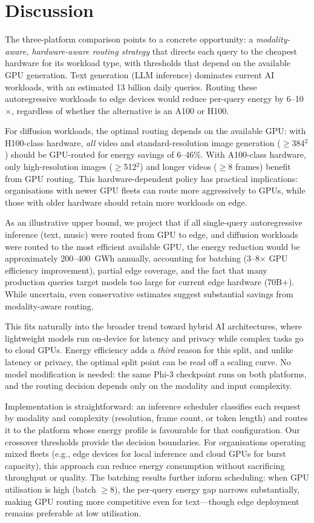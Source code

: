 \documentclass[11pt]{article}
\begin{document}
\section{Discussion}

The three-platform comparison points to a concrete opportunity: a \textit{modality-aware, hardware-aware routing strategy} that directs each query to the cheapest hardware for its workload type, with thresholds that depend on the available GPU generation. Text generation (LLM inference) dominates current AI workloads, with an estimated 13 billion daily queries\cite{devries2023growing}. Routing these autoregressive workloads to edge devices would reduce per-query energy by 6--10$\times$, regardless of whether the alternative is an A100 or H100.

For diffusion workloads, the optimal routing depends on the available GPU: with H100-class hardware, \textit{all} video and standard-resolution image generation ($\geq$384$^2$) should be GPU-routed for energy savings of 6--46\%. With A100-class hardware, only high-resolution images ($\geq$512$^2$) and longer videos ($\geq$8 frames) benefit from GPU routing. This hardware-dependent policy has practical implications: organisations with newer GPU fleets can route more aggressively to GPUs, while those with older hardware should retain more workloads on edge.

As an illustrative upper bound, we project that if all single-query autoregressive inference (text, music) were routed from GPU to edge, and diffusion workloads were routed to the most efficient available GPU, the energy reduction would be approximately 200--400~GWh annually, accounting for batching (3--8$\times$ GPU efficiency improvement\cite{wu2022sustainable}), partial edge coverage, and the fact that many production queries target models too large for current edge hardware (70B+). While uncertain, even conservative estimates suggest substantial savings from modality-aware routing.

This fits naturally into the broader trend toward hybrid AI architectures, where lightweight models run on-device for latency and privacy while complex tasks go to cloud GPUs\cite{xu2024edge}. Energy efficiency adds a \textit{third} reason for this split, and unlike latency or privacy, the optimal split point can be read off a scaling curve. No model modification is needed: the same Phi-3 checkpoint runs on both platforms, and the routing decision depends only on the modality and input complexity.

Implementation is straightforward: an inference scheduler classifies each request by modality and complexity (resolution, frame count, or token length) and routes it to the platform whose energy profile is favourable for that configuration. Our crossover thresholds provide the decision boundaries. For organisations operating mixed fleets (e.g., edge devices for local inference and cloud GPUs for burst capacity), this approach can reduce energy consumption without sacrificing throughput or quality. The batching results further inform scheduling: when GPU utilisation is high (batch $\geq$8), the per-query energy gap narrows substantially, making GPU routing more competitive even for text---though edge deployment remains preferable at low utilisation.
\end{document}

